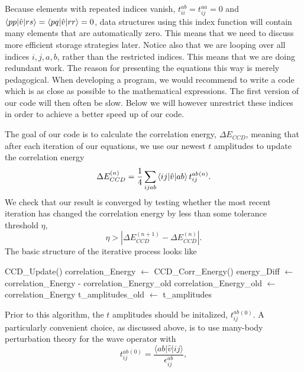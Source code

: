   Because elements with repeated indices vanish,
  $t_{ii}^{ab}=t_{ij}^{aa}=0$ and
  $\braket{pp|\hat{v}|rs}=\braket{pq|\hat{v}|rr}=0$, data structures
  using this index function will contain many elements that are
  automatically zero. This means that we need to discuss more efficient storage
  strategies later. Notice also that we are looping over all
  indices $i,j,a,b$, rather than the restricted indices. This means that we
  are doing redundant work. The reason for presenting the equations this way is merely pedagogical. When developing a program, we would recommend to write a code which is as close as possible to the mathematical expressions. The first version of our code will then often be slow. 
Below we will however unrestrict these indices in order to achieve a better speed up of our code. 

   The goal of our code is to calculate the correlation energy,
   $\Delta E_{CCD}$, meaning that after each iteration of our equations, we use
   our newest $t$ amplitudes to update the correlation energy
  \begin{equation}
  \Delta E_{CCD}^{(n)} = \frac{1}{4} \sum_{ijab}
  \braket{ij|\hat{v}|ab}t^{ab}_{ij}{}^{(n)}.
  \end{equation}
  We check that our result is converged by testing whether the
  most recent iteration has changed the correlation energy by less
  than some tolerance threshold $\eta$,
  \begin{equation}
  \eta > | \Delta E_{CCD}^{(n+1)} - \Delta E_{CCD}^{(n)} |.
  \end{equation}
  The basic structure of the iterative process looks like
\begin{svgraybox}
  \begin{algorithmic}
     \State CCD\_Update()
    \State correlation\_Energy $\gets$ CCD\_Corr\_Energy() \State
    energy\_Diff $\gets$ correlation\_Energy -
    correlation\_Energy\_old \State correlation\_Energy\_old $\gets$
    correlation\_Energy \State t\_amplitudes\_old $\gets$
    t\_amplitudes \EndWhile
  \end{algorithmic}
\end{svgraybox}
  Prior to this algorithm, the $t$ amplitudes should be initalized,
  $t_{ij}^{ab}{}^{(0)}$. A particularly convenient choice, as discussed above, is to 
use many-body perturbation theory for the wave operator with
  \begin{equation}
  t_{ij}^{ab}{}^{(0)} = \frac{\langle ab \vert \hat{v} \vert ij\rangle}{\epsilon^{ab}_{ij}},
  \label{eq:ccdGuess}
  \end{equation}
